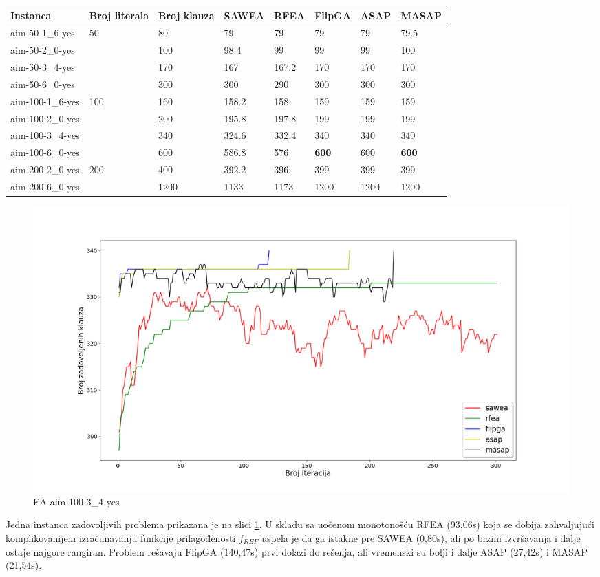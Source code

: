 \documentclass[a4paper]{article}
\begin{document}
\begin{table}[h!]
\centering
{}\label{tab:ea_SAT} 
\begin{tabular}{ |p{2.4cm}|p{1cm}|p{1cm}||p{1.2cm}|p{1.2cm}|p{1.2cm}|p{1.2cm}|p{1.2cm}|}
\hline
Instanca & Broj \break literala & Broj \break klauza & SAWEA & RFEA & FlipGA & ASAP & MASAP\\ 
 \hline
 aim-50-1\_6-yes & 50 & 80 & 79 & 79 & 79 &  79 & 79.5 \\ 
 aim-50-2\_0-yes &  & 100 &  98.4 &  99 & 99 & 99 & 100 \\ 
 aim-50-3\_4-yes &  & 170 & 167 & 167.2 & 170 & 170 & 170  \\ 
 aim-50-6\_0-yes &  & 300 &  300 & 290 &  300 &  300 & 300 \\ 
 \hline
 aim-100-1\_6-yes & 100 & 160 & 158.2 & 158 &  159 & 159 & 159 \\ 
 aim-100-2\_0-yes &  & 200 & 195.8 &  197.8 & 199 &  199 & 199 \\ 
 aim-100-3\_4-yes &  & 340 & 324.6  & 332.4 & 340 & 340 & 340 \\ 
 aim-100-6\_0-yes &  & 600 &  586.8 & 576 & \textbf{600} & 600 & \textbf{600}\\ 
 \hline
 aim-200-2\_0-yes & 200 & 400 &  392.2 & 396 & 399 & 399 & 399 \\ 
 aim-200-6\_0-yes &  & 1200 & 1133 & 1173 &  1200 & 1200 & 1200 \\ 
 \hline
\end{tabular} 
\end{table}


\begin{figure}[h!]
\centering
\includegraphics[width=\textwidth]{ea-aim-100-3_4-yes}
\caption{EA aim-100-3\_4-yes}\label{img:ea_yes1}
\end{figure}

Jedna instanca zadovoljivih problema prikazana je na slici \ref{img:ea_yes1}.
U skladu sa uočenom monotonošću RFEA (93,06s) koja se dobija zahvaljujući komplikovanijem
izračunavanju funkcije prilagođenosti $f_{REF}$ uspela je da ga istakne pre 
SAWEA (0,80s), ali po brzini
izvršavanja i dalje ostaje najgore rangiran. Problem rešavaju FlipGA (140,47s) 
prvi dolazi do rešenja, ali vremenski su bolji i dalje ASAP (27,42s) i MASAP (21,54s). \\
\end{document}
